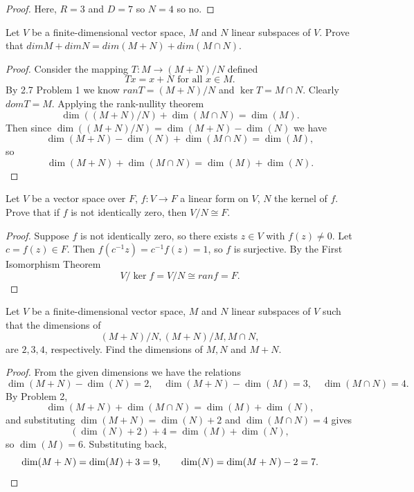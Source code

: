 \begin{proof}
    Here, $R = 3$ and $D = 7$ so $N = 4$ so no.
\end{proof}


\begin{tcolorbox}[title=Problem 2, breakable]
    Let $V$ be a finite-dimensional vector space, $M$ and $N$ linear 
    subspaces of $V$. Prove that $dim M + dim N = dim(M + N) + dim(M \cap N)$.
\end{tcolorbox}

\begin{proof}
    Consider the mapping $T : M \longrightarrow (M + N) / N$ defined 
    \[Tx = x + N \text{ for all } x \in M.\]
    By 2.7 Problem 1 we know $ran T = (M + N) / N$ and $\ker T = M \cap N$.
    Clearly $dom T = M$. Applying the rank-nullity theorem 
    \[\dim((M + N) / N) + \dim(M \cap N) = \dim(M).\]
    Then since $\dim((M + N) / N) = \dim(M + N) - \dim(N)$ we have 
    \[\dim(M + N) - \dim(N) + \dim(M \cap N) = \dim(M),\]
    so 
    \[\dim(M + N) + \dim(M \cap N) = \dim(M) + \dim(N).\]
\end{proof}

\begin{tcolorbox}[title=Problem 3, breakable]
    Let $V$ be a vector space over $F$, $f : V \longrightarrow F$ a linear form on $V$,
    $N$ the kernel of $f$. Prove that if $f$ is not identically zero, then 
    $V / N \cong F$.
\end{tcolorbox}

\begin{proof}
    Suppose $f$ is not identically zero, so there exists $z \in V$ with $f(z) \ne 0$.
    Let $c = f(z) \in F$. Then $f(c^{-1} z) = c^{-1} f(z) = 1$, so $f$ is surjective.
    By the First Isomorphism Theorem 
    \[V / \ker f = V / N \cong ran f = F.\]
\end{proof}

\begin{tcolorbox}[title=Problem 4, breakable]
    Let $V$ be a finite-dimensional vector space, $M$ and $N$ 
    linear subspaces of $V$ such that the dimensions of 
    \[(M + N)/N, (M + N)/M, M \cap N,\]
    are $2, 3, 4$, respectively. Find the dimensions of $M, N$ and $M + N$.
\end{tcolorbox}

\begin{proof}
    From the given dimensions we have the relations
    \[\dim(M + N) - \dim(N) = 2, \quad \dim(M + N) - \dim(M) = 3, \quad \dim(M \cap N) = 4.\]
    By Problem 2,
    \[\dim(M + N) + \dim(M \cap N) = \dim(M) + \dim(N),\]
    and substituting $\dim(M + N) = \dim(N) + 2$ and $\dim(M \cap N) = 4$ gives
    \[(\dim(N) + 2) + 4 = \dim(M) + \dim(N),\]
    so $\dim(M) = 6$. Substituting back,
    \[\dim(M + N) = \dim(M) + 3 = 9, \qquad \dim(N) = \dim(M + N) - 2 = 7. \qquad \qedhere\]
\end{proof}

